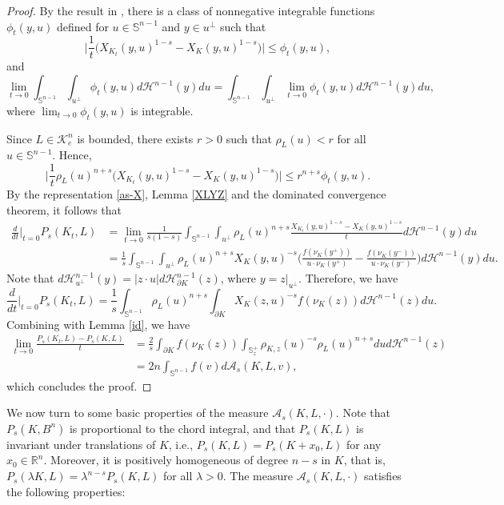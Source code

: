 \documentclass[12pt, oneside,reqno]{amsart}
\numberwithin{equation}{section}
\newtheorem{definition and theorem}[theorem]{Definition and Theorem}
\newcommand{\tA}{\mathcal{A}_s}
\theoremstyle{plain}
\theoremstyle{remark}
\theoremstyle{definition}
\newcommand{\sn}{{\mathbb S}^{n-1}}
\newcommand{\rn}{\mathbb R^n}
\newcommand{\tk}{\mathcal{K}}
\newcommand{\tH}{\mathcal{H}}
\begin{document}
\begin{proof}
{ By the result in \cite[Lemma 5.4]{LXYZ2020}}, there is a class of nonnegative integrable functions $\phi_t(y,u)$ defined for $u\in\sn$ and $y\in u^{\perp}$ such that
\[\Big|\frac{1}{t}\Big(X_{K_t}(y,u)^{1-s}-X_K(y,u)^{1-s}\Big)\Big|\leq \phi_t(y,u),\]
and
\[\lim_{t\rightarrow 0}\int_{\sn}\int_{u^{\perp}}\phi_t(y,u)d\tH^{n-1}(y)du=\int_{\sn}\int_{u^{\perp}}\lim_{t\rightarrow 0}\phi_t(y,u)d\tH^{n-1}(y)du,\]
where $\lim_{t\rightarrow 0}\phi_t(y,u)$ is integrable.

    Since $L\in \tk_e^n$ is bounded, there exists $r>0$ such that $\rho_L(u)<r$ for all $u\in\sn$. Hence, 
    \[\Big|\frac{1}{t}\rho_L(u)^{n+s}\Big(X_{K_t}(y,u)^{1-s}-X_K(y,u)^{1-s}\Big)\Big|\leq r^{n+s}\phi_t(y,u).\]
    By the representation \eqref{as-X}, Lemma \ref{XLYZ} and the dominated convergence theorem, it follows that
    \begin{align*}
        \frac{d}{dt}\Big|_{t=0}P_s(K_t,L)
        &=\lim_{t\rightarrow 0}\frac{1}{s(1-s)}\int_{\sn}\int_{u^{\perp}}\rho_L(u)^{n+s} \frac{X_{K_t}(y,u)^{1-s}-X_K(y,u)^{1-s}}{t}d\tH^{n-1}(y)du\\
        &=\frac{1}{s}\int_{\sn}\int_{u^{\perp}}\rho_L(u)^{n+s} X_K(y,u)^{-s}\Big(\frac{f(\nu_K(y^+))}{u\cdot\nu_K(y^+)}-\frac{f(\nu_K(y^-))}{u\cdot \nu_K(y^-)}\Big)d\tH^{n-1}(y)du.
    \end{align*}
     Note that $d\tH^{n-1}_{u^{\perp}}(y)=|z\cdot u|d\tH^{n-1}_{\partial K}(z)$, where $y=z|_{u^{\perp}}$. Therefore, we have
    \[\frac{d}{dt}\Big|_{t=0}P_s(K_t,L)=\frac{1}{s}\int_{\sn}\rho_L(u)^{n+s}\int_{\partial K}X_K(z,u)^{-s}f(\nu_K(z))d\tH^{n-1}(z)du.\]
    Combining with Lemma \ref{id}, we have
    \begin{align*}
    \lim_{t\rightarrow 0}\frac{P_s(K_t,L)-P_s(K,L)}{t}&=\frac{2}{s}\int_{\partial K}f(\nu_{K}(z))\int_{\mathbb S_z^+}\rho_{K,z}(u)^{-s}\rho_L(u)^{n+s}dud\tH^{n-1}(z)\\
    &=2n\int_{\sn}f(v)d\mathcal{A}_s(K,L,v),
    \end{align*}
    which concludes the proof.
\end{proof}

We now turn to some basic properties of the measure $\tA (K,L,\cdot)$. Note that $P_s(K,B^n)$ is proportional to the chord integral, and that $P_s(K,L)$ is invariant under translations of $K$, i.e.,  $P_s(K,L)=P_s(K+x_0,L)$ for any $x_0\in\rn$. Moreover, it is positively homogeneous of degree $n-s$ in $K$, that is, $P_s(\lambda K,L)=\lambda^{n-s}P_s(K,L)$ for all $\lambda>0$. The measure $\tA(K,L,\cdot)$ satisfies the following properties:
\end{document}
